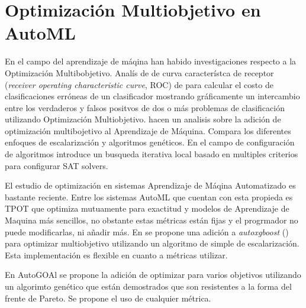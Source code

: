 

\section{Optimizaci\'on Multiobjetivo en AutoML}


En el campo del aprendizaje de m\'aqina han habido investigaciones respecto a la Optimizaci\'on Multibobjetivo.  Anal\'is de de curva caracter\'istca de receptor (\textit{receiver operating characteristic curve}, ROC) de \cite{everson2006multi} para calcular el costo de clasificaciones err\'oneas de un clasificador mostrando gr\'aficamente un intercambio entre los verdaderos y falsos positvos de dos o m\'as problemas de clasificaci\'on utilizando Optimizaci\'on Multiobjetivo. 
\cite{jin2008pareto} hacen un analisis sobre la adici\'on de optimizaci\'on multibojetivo al Aprendizaje de M\'aquina. Compara los diferentes enfoques de escalarizaci\'on y algoritmos gen\'eticos.
En el campo de configuraci\'on de algoritmos \cite{blot2016mo} introduce un busqueda iterativa local basado en multiples criterios para configurar SAT solvers.

El estudio de optimizaci\'on en sistemas Aprendizaje de M\'aqina Automatizado es bastante reciente. Entre los sistemas AutoML que cuentan con esta propieda es TPOT \cite{pmlr-v64-olson_tpot_2016} que optimiza mutuamente para exactitud y modelos de Aprendizaje de Maquina m\'as sencillos, no obstante estas m\'etricas est\'an fijas y el progrmador no puede modificarlas, ni a\~nadir m\'as.
En \cite{pfisterer2019multi} se propone una adici\'on a \textit{autoxgboost} (\cite{thomas2018automatic}) para optimizar multiobjetivo utilizando un algoritmo de simple de escalarizaci\'on. Esta implementaci\'on es flexible en cuanto a m\'etricas utilizar.

En AutoGOAl se propone la adici\'on de optimizar para varios objetivos utilizando un algorimto gen\'etico que est\'an demostrados que son resistentes a la forma del frente de Pareto. Se propone el uso de cualquier m\'etrica.


